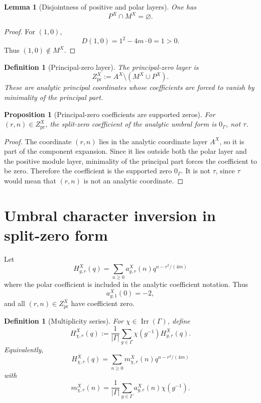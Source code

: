 \documentclass[11pt]{article}
\newtheorem{proposition}[theorem]{Proposition}
\newtheorem{lemma}[theorem]{Lemma}
\newtheorem{definition}[theorem]{Definition}
\newcommand{\Irr}{\operatorname{Irr}}
\begin{document}
\begin{lemma}[Disjointness of positive and polar layers]
One has
\[
P^X\cap M^X=\varnothing.
\]
\end{lemma}

\begin{proof}
For \((1,0)\),
\[
D(1,0)=1^2-4m\cdot0=1>0.
\]
Thus \((1,0)\notin M^X\).
\end{proof}

\begin{definition}[Principal-zero layer]
The principal-zero layer is
\[
Z^X_{\mathrm{pr}}:=A^X\setminus(M^X\cup P^X).
\]
These are analytic principal coordinates whose coefficients are forced to vanish by minimality of the principal part.
\end{definition}

\begin{proposition}[Principal-zero coefficients are supported zeros]
For \((r,n)\in Z^X_{\mathrm{pr}}\), the split-zero coefficient of the analytic umbral form is \(0_\Gamma\), not \(\tau\).
\end{proposition}

\begin{proof}
The coordinate \((r,n)\) lies in the analytic coordinate layer \(A^X\), so it is part of the component expansion.  Since it lies outside both the polar layer and the positive module layer, minimality of the principal part forces the coefficient to be zero.  Therefore the coefficient is the supported zero \(0_\Gamma\).  It is not \(\tau\), since \(\tau\) would mean that \((r,n)\) is not an analytic coordinate.
\end{proof}

\section{Umbral character inversion in split-zero form}

Let
\[
H_{g,r}^X(q)=\sum_{n\ge0}a^X_{g,r}(n)q^{n-r^2/(4m)}
\]
where the polar coefficient is included in the analytic coefficient notation.  Thus
\[
a^X_{g,1}(0)=-2,
\]
and all \((r,n)\in Z^X_{\mathrm{pr}}\) have coefficient zero.

\begin{definition}[Multiplicity series]
For \(\chi\in\Irr(\Gamma)\), define
\[
H^X_{\chi,r}(q):=\frac1{|\Gamma|}\sum_{g\in\Gamma}\chi(g^{-1})H^X_{g,r}(q).
\]
Equivalently,
\[
H^X_{\chi,r}(q)=\sum_{n\ge0}m^X_{\chi,r}(n)q^{n-r^2/(4m)}
\]
with
\[
m^X_{\chi,r}(n)=\frac1{|\Gamma|}\sum_{g\in\Gamma}a^X_{g,r}(n)\chi(g^{-1}).
\]
\end{definition}
\end{document}
